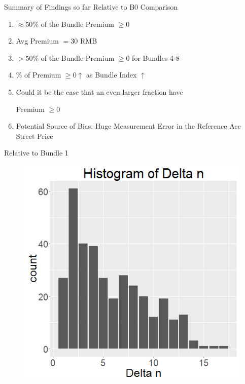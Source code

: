 \documentclass[xcolor=dvipsnames,12pt]{beamer}
\theoremstyle{definition}
\begin{document}
\begin{frame}{Summary of Findings so far}
Relative to B0 Comparison
\begin{enumerate}
	\item $\approx 50\%$ of the Bundle Premium $\ge 0 $ \pause
	\item Avg Premium $= 30$ RMB \pause
	\item $> 50\%$ of the Bundle Premium $\ge 0 $ for Bundles 4-8\pause
	\item \% of Premium $\ge 0 \uparrow$ as Bundle Index $\uparrow$ \pause 
	\item Could it be the case that an even larger fraction have 
	\begin{center}
	Premium  $\ge 0 $  \pause
	\end{center}
	\item Potential Source of Bias: Huge Measurement Error in the Reference Acc Street Price \pause

\end{enumerate}
\end{frame}

{
\begin{center}

\end{center}
}

\begin{frame}{Relative to Bundle 1}
\begin{figure}

\graphicspath{ {../../1_relative_to_bundle_1/} }
\includegraphics[scale=0.43]{1_histogram_of_delta_n_rel_to_bundle_1}
\end{figure}
\end{frame}
\end{document}
